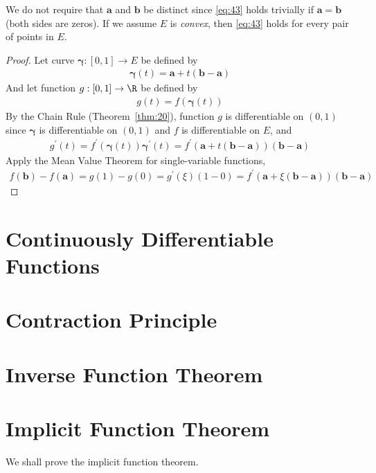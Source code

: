 \documentclass[thmcnt=section, 12pt]{elegantbook}
\begin{document}
\begin{remark}
    We do not require that $\mathbf{a}$ and $\mathbf{b}$ be distinct since \eqref{eq:43} holds trivially if $\mathbf{a} = \mathbf{b}$ (both sides are zeros). If we assume $E$ is \textit{convex}, then \eqref{eq:43} holds for every pair of points in $E$.
\end{remark}

\begin{proof}
    Let curve $\boldsymbol{\gamma}: [0,1] \to E$ be defined by 
    \begin{align*}
        \boldsymbol{\gamma}(t) = \mathbf{a} + t (\mathbf{b} - \mathbf{a})
    \end{align*}
    And let function $g: [0,1] \to \R$ be defined by 
    \begin{align*}
        g(t) = f(\boldsymbol{\gamma}(t))
    \end{align*}
    By the Chain Rule (Theorem~\ref{thm:20}), function $g$ is differentiable on $(0,1)$ since $\boldsymbol{\gamma}$ is differentiable on $(0,1)$ and $f$ is differentiable on $E$, and 
    \begin{align*}
        g^\prime(t) 
        = f^\prime(\boldsymbol{\gamma}(t)) \boldsymbol{\gamma}^\prime(t)
        = f^\prime(\mathbf{a} + t (\mathbf{b} - \mathbf{a})) (\mathbf{b} - \mathbf{a})
    \end{align*}
    Apply the Mean Value Theorem for single-variable functions, 
    \begin{align*}
        f(\mathbf{b}) - f(\mathbf{a}) = g(1) - g(0) = g^\prime(\xi) (1 - 0)
        = f^\prime(\mathbf{a} + \xi (\mathbf{b} - \mathbf{a})) (\mathbf{b} - \mathbf{a})
    \end{align*}
\end{proof}


\section{Continuously Differentiable Functions}


\section{Contraction Principle}


\section{Inverse Function Theorem}


\section{Implicit Function Theorem}

\par We shall prove the implicit function theorem.

\end{document}

